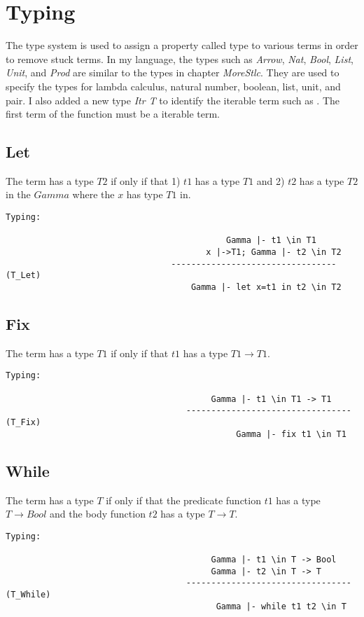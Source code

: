 \section{Typing}
\label{sec:type}
The type system is used to assign a property called type to various terms in order to remove stuck terms. 
In my language, the types such as \textit{Arrow}, \textit{Nat}, \textit{Bool}, \textit{List}, \textit{Unit}, and \textit{Prod} are similar to the types in chapter \textit{MoreStlc}.
They are used to specify the types for lambda calculus, natural number, boolean, list, unit, and pair.
I also added a new type \textit{Itr T} to identify the iterable term such as \gen. 
The first term of the \nt function must be a iterable term.

\subsection{Let}
The \lt term has a type $T2$  if only if that 1) $t1$ has a type $T1$ and 2) $t2$ has a type $T2$ in the $Gamma$ where the $x$ has type $T1$ in.
\begin{lstlisting}
Typing:

											Gamma |- t1 \in T1
										x |->T1; Gamma |- t2 \in T2
								 ---------------------------------   (T_Let)
									 Gamma |- let x=t1 in t2 \in T2
\end{lstlisting}

\subsection{Fix}
The \fix term has a type $T1$ if only if that $t1$ has a type $T1 \rightarrow T1$.
\begin{lstlisting}
Typing:

									     Gamma |- t1 \in T1 -> T1
									---------------------------------   (T_Fix)
									 		  Gamma |- fix t1 \in T1
\end{lstlisting}

\subsection{While}
The \while term has a type $T$ if only if that the predicate function $t1$ has a type $T \rightarrow Bool$ and the body function $t2$ has a type $T \rightarrow T$.
\begin{lstlisting}
Typing:

									     Gamma |- t1 \in T -> Bool
									     Gamma |- t2 \in T -> T
									---------------------------------   (T_While)
										  Gamma |- while t1 t2 \in T
\end{lstlisting}


